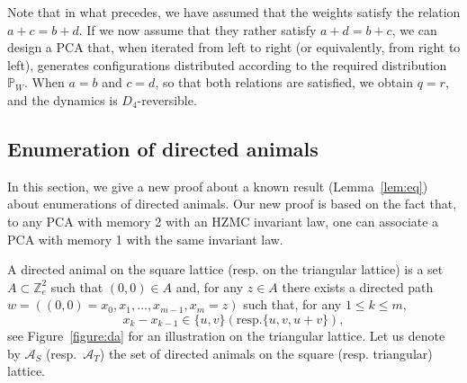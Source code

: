 \documentclass[AHL,Unicode,longabstracts]{cedram}
\newcounter{a}
\newcommand{\Z}{\mathbb{Z}}
\begin{document}
Note that in what precedes, we have assumed that the weights satisfy the relation $a+c=b+d$. If we now assume that they rather satisfy $a+d=b+c$, we can design a PCA that, when iterated from left to right (or equivalently, from right to left), generates configurations distributed according to the required distribution ${\mathbb P}_W$. When $a=b$ and $c=d$, so that both relations are satisfied, we obtain $q=r$, and the dynamics is $D_4$-reversible.

\subsection{Enumeration of directed animals} \label{sec:animals}
In this section, we give a new proof about a known result (Lemma~\ref{lem:eq}) about enumerations of directed animals. Our new proof is based on the fact that, to any PCA with memory 2 with an HZMC invariant law, one can associate a PCA with memory 1 with the same invariant law.

A directed animal on the square lattice (resp. on the triangular lattice) is a set $A \subset \Z_{e}^2$ such that $(0,0) \in A$ and, for any $z \in A$ there exists a directed path $w=((0,0) = x_0, x_1, \dots, x_{m-1}, x_m=z)$ such that, for any $1 \leq k \leq m$,
\[
x_k-x_{k-1} \in \{u,v\} (\text{resp.}\{u,v,u+v\}),
\]
see Figure~\ref{figure:da} for an illustration on the triangular lattice. Let us denote by $\mathcal{A}_S$ (resp.~$\mathcal{A}_T$) the set of directed animals on the square (resp. triangular) lattice.
\end{document}
